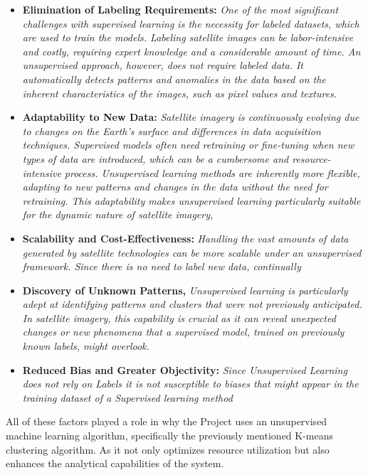 \begin{itemize}
    \item \textbf{Elimination of Labeling Requirements:}
    \textit{ One of the most significant challenges with supervised learning is the necessity for labeled datasets, which are used to train the models.
    Labeling satellite images can be labor-intensive and costly, requiring expert knowledge and a considerable amount of time.
    An unsupervised approach, however, does not require labeled data.
    It automatically detects patterns and anomalies in the data based on the inherent characteristics of the images, such as pixel values and textures.}
    \item \textbf{Adaptability to New Data:}
    \textit{Satellite imagery is continuously evolving due to changes on the Earth's surface and differences in data acquisition techniques.
    Supervised models often need retraining or fine-tuning when new types of data are introduced, which can be a cumbersome and resource-intensive process.
    Unsupervised learning methods are inherently more flexible, adapting to new patterns and changes in the data without the need for retraining.
    This adaptability makes unsupervised learning particularly suitable for the dynamic nature of satellite imagery, }
    \item \textbf{Scalability and Cost-Effectiveness:}
    \textit{Handling the vast amounts of data generated by satellite technologies can be more scalable under an unsupervised framework.
    Since there is no need to label new data, continually}
    \item \textbf{Discovery of Unknown Patterns, }
    \textit{Unsupervised learning is particularly adept at identifying patterns and clusters that were not previously anticipated.
    In satellite imagery, this capability is crucial as it can reveal unexpected changes or new phenomena that a supervised model,
        trained on previously known labels, might overlook.}
    \item \textbf{Reduced Bias and Greater Objectivity:}
    \textit{Since Unsupervised Learning does not rely on Labels it is not susceptible to biases that might appear in the training dataset of a Supervised learning method}
\end{itemize}

All of these factors played a role in why the Project uses an unsupervised machine learning algorithm, specifically the previously mentioned K-means clustering
algorithm.
As it not only optimizes resource utilization but also enhances the analytical capabilities of the system.

